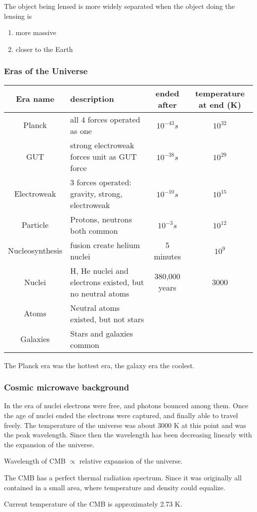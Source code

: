 The object being lensed is more widely separated when the object doing the lensing is
\begin{enumerate}
    \item more massive
    \item closer to the Earth
\end{enumerate}%

\subsubsection{Eras of the Universe}

\begin{tabular}{c|p{6cm}|c|c}
    Era name & description & ended after & temperature at end (K) \\ \hline
    Planck & all 4 forces operated as one & $10^{-43} s$ & $10^{32}$ \\
    GUT & strong electroweak forces unit as GUT force & $10^{-38} s$ & $10^{29}$ \\
    Electroweak & 3 forces operated: gravity, strong, electroweak & $10^{-10} s$ & $10^{15}$ \\
    Particle & Protons, neutrons both common & $10^{-3} s$ & $10^{12}$ \\
    Nucleosynthesis & fusion create helium nuclei & 5 minutes & $10^{9}$ \\
    Nuclei & H, He nuclei and electrons existed, but no neutral atoms & 380,000 years & 3000 \\
    Atoms & Neutral atoms existed, but not stars & & \\
    Galaxies & Stars and galaxies common & &
\end{tabular}

The Planck era was the hottest era, the galaxy era the coolest.

\subsubsection{Cosmic microwave background}

In the era of nuclei electrons were free, and photons bounced among them.  Once the age of nuclei ended the electrons were captured, and finally able to travel freely.  The temperature of the universe was about 3000 K at this point and was the peak wavelength.  Since then the wavelength has been decreasing linearly with the expansion of the universe.

Wavelength of CMB $\propto$ relative expansion of the universe.

The CMB has a perfect thermal radiation spectrum.  Since it was originally all contained in a small area, where temperature and density could equalize.

Current temperature of the CMB is approximately 2.73 K.
